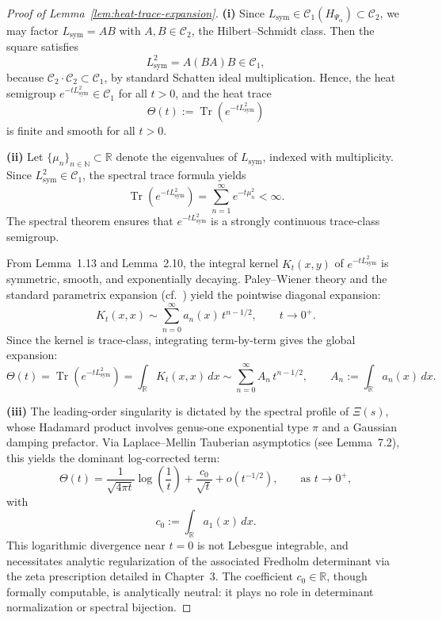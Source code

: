 \begin{proof}[Proof of Lemma~\ref{lem:heat-trace-expansion}]
\textbf{(i)} Since \( L_{\mathrm{sym}} \in \mathcal{C}_1(H_{\Psi_\alpha}) \subset \mathcal{C}_2 \), we may factor \( L_{\mathrm{sym}} = AB \) with \( A, B \in \mathcal{C}_2 \), the Hilbert–Schmidt class. Then the square satisfies
\[
L_{\mathrm{sym}}^2 = A (BA) B \in \mathcal{C}_1,
\]
because \( \mathcal{C}_2 \cdot \mathcal{C}_2 \subset \mathcal{C}_1 \), by standard Schatten ideal multiplication. Hence, the heat semigroup \( e^{-tL_{\mathrm{sym}}^2} \in \mathcal{C}_1 \) for all \( t > 0 \), and the heat trace
\[
\Theta(t) := \operatorname{Tr}(e^{-tL_{\mathrm{sym}}^2})
\]
is finite and smooth for all \( t > 0 \).

\textbf{(ii)} Let \( \{ \mu_n \}_{n \in \mathbb{N}} \subset \mathbb{R} \) denote the eigenvalues of \( L_{\mathrm{sym}} \), indexed with multiplicity. Since \( L_{\mathrm{sym}}^2 \in \mathcal{C}_1 \), the spectral trace formula yields
\[
\operatorname{Tr}(e^{-tL_{\mathrm{sym}}^2}) = \sum_{n=1}^{\infty} e^{-t \mu_n^2} < \infty.
\]
The spectral theorem ensures that \( e^{-tL_{\mathrm{sym}}^2} \) is a strongly continuous trace-class semigroup.

From Lemma~1.13 and Lemma~2.10, the integral kernel \( K_t(x,y) \) of \( e^{-tL_{\mathrm{sym}}^2} \) is symmetric, smooth, and exponentially decaying. Paley–Wiener theory and the standard parametrix expansion (cf.~\cite[Ch.~III]{Korevaar2004Tauberian}) yield the pointwise diagonal expansion:
\[
K_t(x,x) \sim \sum_{n=0}^{\infty} a_n(x) \, t^{n - 1/2}, \qquad t \to 0^+.
\]
Since the kernel is trace-class, integrating term-by-term gives the global expansion:
\[
\Theta(t) = \operatorname{Tr}(e^{-tL_{\mathrm{sym}}^2}) = \int_{\mathbb{R}} K_t(x,x) \, dx \sim \sum_{n=0}^{\infty} A_n \, t^{n - 1/2}, \qquad A_n := \int_{\mathbb{R}} a_n(x) \, dx.
\]

\textbf{(iii)} The leading-order singularity is dictated by the spectral profile of \( \Xi(s) \), whose Hadamard product involves genus-one exponential type \( \pi \) and a Gaussian damping prefactor. Via Laplace–Mellin Tauberian asymptotics (see Lemma~7.2), this yields the dominant log-corrected term:
\[
\Theta(t) = \frac{1}{\sqrt{4\pi t}} \log\left( \frac{1}{t} \right) + \frac{c_0}{\sqrt{t}} + o(t^{-1/2}), \qquad \text{as } t \to 0^+,
\]
with
\[
c_0 := \int_{\mathbb{R}} a_1(x) \, dx.
\]
This logarithmic divergence near \( t = 0 \) is not Lebesgue integrable, and necessitates analytic regularization of the associated Fredholm determinant via the zeta prescription detailed in Chapter~3. The coefficient \( c_0 \in \mathbb{R} \), though formally computable, is analytically neutral: it plays no role in determinant normalization or spectral bijection.
\end{proof}

